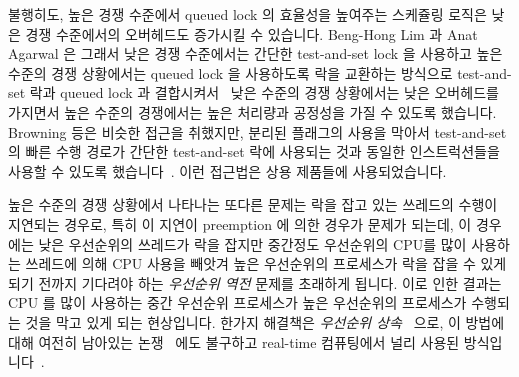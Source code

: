 불행히도, 높은 경쟁 수준에서 queued lock 의 효율성을 높여주는 스케쥴링 로직은
낮은 경쟁 수준에서의 오버헤드도 증가시킬 수 있습니다.
Beng-Hong Lim 과 Anat Agarwal 은 그래서 낮은 경쟁 수준에서는 간단한
test-and-set lock 을 사용하고 높은 수준의 경쟁 상황에서는 queued lock 을
사용하도록 락을 교환하는 방식으로 test-and-set 락과 queued lock 과
결합시켜서~\cite{BengHongLim94} 낮은 수준의 경쟁 상황에서는 낮은 오버헤드를
가지면서 높은 수준의 경쟁에서는 높은 처리량과 공정성을 가질 수 있도록 했습니다.
Browning 등은 비슷한 접근을 취했지만, 분리된 플래그의 사용을 막아서
test-and-set 의 빠른 수행 경로가 간단한 test-and-set 락에 사용되는 것과 동일한
인스트럭션들을 사용할 수 있도록
했습니다~\cite{LukeBrowning2005SimpleLockNUMAAware}.
이런 접근법은 상용 제품들에 사용되었습니다.

높은 수준의 경쟁 상황에서 나타나는 또다른 문제는 락을 잡고 있는 쓰레드의 수행이
지연되는 경우로, 특히 이 지연이 preemption 에 의한 경우가 문제가 되는데, 이
경우에는 낮은 우선순위의 쓰레드가 락을 잡지만 중간정도 우선순위의 CPU를 많이
사용하는 쓰레드에 의해 CPU 사용을 빼앗겨 높은 우선순위의 프로세스가 락을 잡을
수 있게 되기 전까지 기다려야 하는 \emph{우선순위 역전} 문제를 초래하게 됩니다.
이로 인한 결과는 CPU 를 많이 사용하는 중간 우선순위 프로세스가 높은 우선순위의
프로세스가 수행되는 것을 막고 있게 되는 현상입니다.
한가지 해결책은 \emph{우선순위 상속}~\cite{Lampson1980Mesa} 으로, 이 방법에
대해 여전히 남아있는 논쟁~\cite{Yodaiken2004FSM,DougLocke2002a} 에도 불구하고
real-time 컴퓨팅에서 널리 사용된
방식입니다~\cite{Sha1990IEEETransComp,JonathanCorbet2006PriorityInheritance}.
\iffalse

